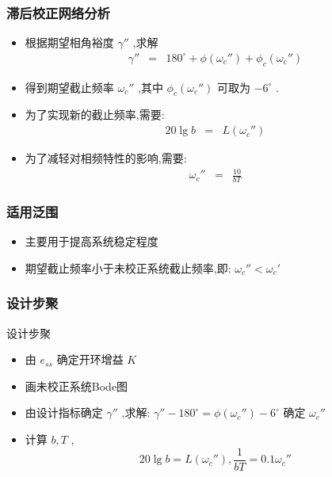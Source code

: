 \documentclass[table]{article}
\begin{document}
\begin{frame}
\frametitle{滞后校正网络分析}
\label{sec-3-1-2}

\begin{itemize}
\item 根据期望相角裕度 $\gamma''$ ,求解
      \begin{eqnarray*}
      \gamma'' & = &180^{\circ}+\phi(\omega_c'')+\phi_c(\omega_c'') 
      \end{eqnarray*}
\item <2->得到期望截止频率 $\omega_c''$ ,其中 $\phi_c(\omega_c'')$ 可取为 $-6^\circ$ .
\item <3->为了实现新的截止频率,需要:
      \begin{eqnarray*}
      20\lg b & = & L(\omega_c'') 
      \end{eqnarray*}
\item <4->为了减轻对相频特性的影响,需要:
      \begin{eqnarray*}
       \omega_c'' & = & \frac{10}{bT}
      \end{eqnarray*}
\end{itemize}
\end{frame}
\begin{frame}
\frametitle{适用泛围}
\label{sec-3-1-3}

\begin{itemize}
\item 主要用于提高系统稳定程度
\item 期望截止频率小于未校正系统截止频率,即: $\omega_c''<\omega_c'$
\end{itemize}
\end{frame}
\begin{frame}
\frametitle{设计步聚}
\label{sec-3-1-4}

设计步聚
\begin{itemize}
\item 由 $e_{ss}$ 确定开环增益 $K$
\item 画未校正系统Bode图
\item <2->由设计指标确定 $\gamma''$ ,求解:  $\gamma''-180^{\circ} = \phi(\omega_c'')-6^{\circ}$ 确定 $\omega_c''$
\item <3->计算 $b,T$ , 
         \[20\lg b=L(\omega_c''),\frac{1}{bT}=0.1\omega_c''\]
\end{itemize}
\end{frame}
\end{document}
